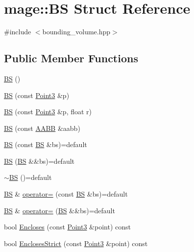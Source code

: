 \hypertarget{structmage_1_1_b_s}{}\section{mage\+:\+:BS Struct Reference}
\label{structmage_1_1_b_s}


{\ttfamily \#include $<$bounding\+\_\+volume.\+hpp$>$}

\subsection*{Public Member Functions}
\begin{DoxyCompactItemize}
\item 
\hyperlink{structmage_1_1_b_s_aa34921d9ea23b9a724ddf739b3adabfa}{BS} ()
\item 
\hyperlink{structmage_1_1_b_s_ae64c575576180fb6409125c8792c2d29}{BS} (const \hyperlink{structmage_1_1_point3}{Point3} \&p)
\item 
\hyperlink{structmage_1_1_b_s_a23be36778ebc6b31fcfb31fb032fdb0e}{BS} (const \hyperlink{structmage_1_1_point3}{Point3} \&p, float r)
\item 
\hyperlink{structmage_1_1_b_s_adb709aad7bd4b6816ae59ec87221bd6a}{BS} (const \hyperlink{structmage_1_1_a_a_b_b}{A\+A\+BB} \&aabb)
\item 
\hyperlink{structmage_1_1_b_s_a01cf5aaeae2a87c56527a338889f5079}{BS} (const \hyperlink{structmage_1_1_b_s}{BS} \&bs)=default
\item 
\hyperlink{structmage_1_1_b_s_a8974a41ba4a204e1b7ad5a218f9629e8}{BS} (\hyperlink{structmage_1_1_b_s}{BS} \&\&bs)=default
\item 
\hyperlink{structmage_1_1_b_s_a111f60f8ab53c7497ff7aaa743619829}{$\sim$\+BS} ()=default
\item 
\hyperlink{structmage_1_1_b_s}{BS} \& \hyperlink{structmage_1_1_b_s_aef60d898cb44bbf1e3988351b5717faa}{operator=} (const \hyperlink{structmage_1_1_b_s}{BS} \&bs)=default
\item 
\hyperlink{structmage_1_1_b_s}{BS} \& \hyperlink{structmage_1_1_b_s_a751360f4d52fe40f6f07f29a759c9f0c}{operator=} (\hyperlink{structmage_1_1_b_s}{BS} \&\&bs)=default
\item 
bool \hyperlink{structmage_1_1_b_s_a1298419385ad961cd68deb2ec049879d}{Encloses} (const \hyperlink{structmage_1_1_point3}{Point3} \&point) const
\item 
bool \hyperlink{structmage_1_1_b_s_ad08a02ebf76d2b3a5903c9c69a0e80e1}{Encloses\+Strict} (const \hyperlink{structmage_1_1_point3}{Point3} \&point) const

\end{DoxyCompactItemize}
